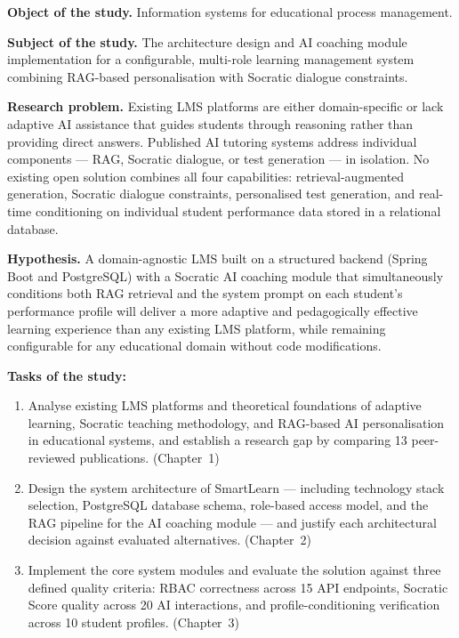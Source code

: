 \documentclass[12pt,a4paper]{report}
\begin{document}
\noindent\textbf{Object of the study.} Information systems for educational process
management.

\noindent\textbf{Subject of the study.} The architecture design and AI coaching
module implementation for a configurable, multi-role learning management system
combining RAG-based personalisation with Socratic dialogue constraints.

\noindent\textbf{Research problem.} Existing LMS platforms are either domain-specific
or lack adaptive AI assistance that guides students through reasoning rather than
providing direct answers. Published AI tutoring systems address individual
components --- RAG, Socratic dialogue, or test generation --- in isolation. No
existing open solution combines all four capabilities: retrieval-augmented
generation, Socratic dialogue constraints, personalised test generation, and
real-time conditioning on individual student performance data stored in a relational
database.

\noindent\textbf{Hypothesis.} A domain-agnostic LMS built on a structured backend
(Spring Boot and PostgreSQL) with a Socratic AI coaching module that simultaneously
conditions both RAG retrieval and the system prompt on each student's performance
profile will deliver a more adaptive and pedagogically effective learning experience
than any existing LMS platform, while remaining configurable for any educational
domain without code modifications.

\noindent\textbf{Tasks of the study:}
\begin{enumerate}[leftmargin=*,label=\arabic*.]
  \item Analyse existing LMS platforms and theoretical foundations of adaptive
  learning, Socratic teaching methodology, and RAG-based AI personalisation in
  educational systems, and establish a research gap by comparing 13 peer-reviewed
  publications. (Chapter~1)
  \item Design the system architecture of SmartLearn --- including technology stack
  selection, PostgreSQL database schema, role-based access model, and the RAG
  pipeline for the AI coaching module --- and justify each architectural decision
  against evaluated alternatives. (Chapter~2)
  \item Implement the core system modules and evaluate the solution against three
  defined quality criteria: RBAC correctness across 15 API endpoints, Socratic Score
  quality across 20 AI interactions, and profile-conditioning verification across 10
  student profiles. (Chapter~3)
\end{enumerate}
\end{document}
